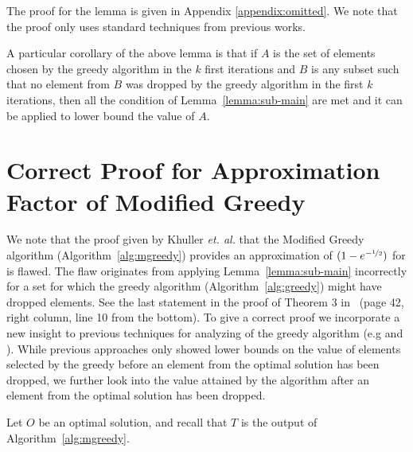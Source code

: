 \documentclass[a4paper,UKenglish,cleveref, autoref]{lipics-v2019}
\begin{document}
The proof for the lemma is given in Appendix  \ref{appendix:omitted}. We note that 
the proof only uses standard techniques from previous works.

A particular corollary of the above lemma is that if $A$ is the set of elements chosen by the greedy algorithm in
the $k$ first iterations and $B$ is any subset such that no element from $B$ was dropped by the greedy algorithm in the first $k$ iterations,
then all the condition of Lemma~\ref{lemma:sub-main} are met and it can be applied to lower bound the value of $A$.







\section{Correct Proof for Approximation Factor of Modified Greedy}\label{sec:ModifiedGreedy}
We note that the proof given by Khuller {\em et. al.} \cite{khuller1999budgeted} that the Modified Greedy algorithm (Algorithm~\ref{alg:mgreedy}) provides an approximation of $ (1-e^{-\nicefrac[]{1}{2}})$ for \SK is flawed.
{{The flaw originates from applying Lemma~\ref{lemma:sub-main} incorrectly for a set for which the greedy algorithm (Algorithm~\ref{alg:greedy}) might have dropped elements.
See the last statement in the proof of Theorem 3 in~\cite{khuller1999budgeted} (page 42, right column, line 10 from the bottom).}}
To give a correct proof we incorporate a new insight to
previous techniques for analyzing of the greedy algorithm
(e.g \cite{khuller1999budgeted} and \cite{LB10}). While previous approaches only
showed lower
bounds on the value of elements selected by the greedy before an
 element from the optimal solution has been dropped, we
further look into the value attained by the algorithm after
an element from the optimal solution has been dropped.

Let $O$ be an optimal solution, and recall that $T$ is the output of Algorithm~\ref{alg:mgreedy}.


\end{document}
